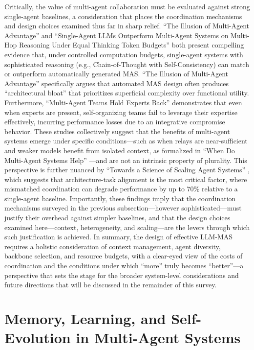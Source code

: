 \documentclass[11pt]{article}
\begin{document}
Critically, the value of multi-agent collaboration must be evaluated against strong single-agent baselines, a consideration that places the coordination mechanisms and design choices examined thus far in sharp relief. ``The Illusion of Multi-Agent Advantage'' \cite{ref108} and ``Single-Agent LLMs Outperform Multi-Agent Systems on Multi-Hop Reasoning Under Equal Thinking Token Budgets'' \cite{ref109} both present compelling evidence that, under controlled computation budgets, single-agent systems with sophisticated reasoning (e.g., Chain-of-Thought with Self-Consistency) can match or outperform automatically generated MAS. ``The Illusion of Multi-Agent Advantage'' \cite{ref108} specifically argues that automated MAS design often produces ``architectural bloat'' that prioritizes superficial complexity over functional utility. Furthermore, ``Multi-Agent Teams Hold Experts Back'' \cite{ref110} demonstrates that even when experts are present, self-organizing teams fail to leverage their expertise effectively, incurring performance losses due to an integrative compromise behavior. These studies collectively suggest that the benefits of multi-agent systems emerge under specific conditions---such as when relays are near-sufficient and weaker models benefit from isolated context, as formalized in ``When Do Multi-Agent Systems Help'' \cite{ref58}---and are not an intrinsic property of plurality. This perspective is further nuanced by ``Towards a Science of Scaling Agent Systems'' \cite{ref111}, which suggests that architecture-task alignment is the most critical factor, where mismatched coordination can degrade performance by up to 70\% relative to a single-agent baseline. Importantly, these findings imply that the coordination mechanisms surveyed in the previous subsection---however sophisticated---must justify their overhead against simpler baselines, and that the design choices examined here---context, heterogeneity, and scaling---are the levers through which such justification is achieved. In summary, the design of effective LLM-MAS requires a holistic consideration of context management, agent diversity, backbone selection, and resource budgets, with a clear-eyed view of the costs of coordination and the conditions under which ``more'' truly becomes ``better''---a perspective that sets the stage for the broader system-level considerations and future directions that will be discussed in the remainder of this survey.

\section{Memory, Learning, and Self-Evolution in Multi-Agent Systems}
\end{document}
